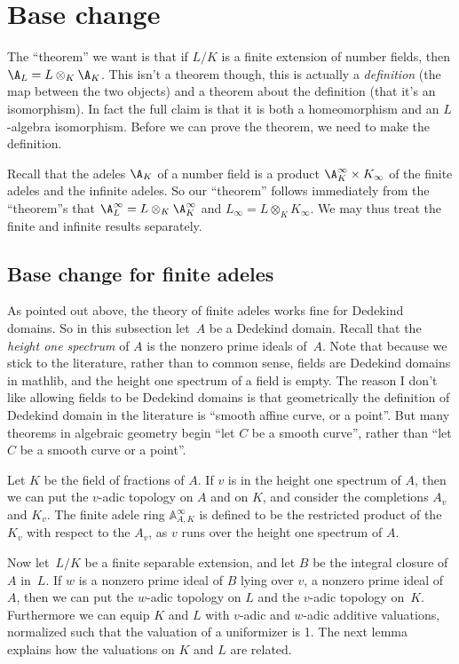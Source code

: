 \section{Base change}

The ``theorem'' we want is that if $L/K$ is a finite extension of number fields,
then $\A_L=L\otimes_K\A_K$. This isn't a theorem though, this is actually a \emph{definition}
(the map between the two objects) and a theorem about
the definition (that it's an isomorphism). In fact the full claim is that it is both a homeomorphism
and an $L$-algebra isomorphism. Before we can prove the theorem, we need to make the
definition.

Recall that the adeles $\A_K$ of a number field is a product $\A_K^\infty\times K_\infty$
of the finite adeles and the infinite adeles. So our ``theorem'' follows immediately from
the ``theorem''s that $\A_L^\infty=L\otimes_K\A_K^\infty$ and $L_\infty=L\otimes_KK_\infty$.
We may thus treat the finite and infinite results separately.

\subsection{Base change for finite adeles}

As pointed out above, the theory of finite adeles works fine for Dedekind domains.
So in this subsection let~$A$ be a Dedekind domain. Recall that the \emph{height one spectrum}
of $A$ is the nonzero prime ideals of~$A$. Note that because we stick to the literature,
rather than to common sense, fields are Dedekind domains in mathlib, and the
height one spectrum of a field is empty. The reason I don't like allowing fields
to be Dedekind domains is that geometrically the definition of Dedekind
domain in the literature is ``smooth affine curve, or a point''. But many theorems in algebraic
geometry begin ``let $C$ be a smooth curve'', rather than ``let $C$ be a smooth curve or a point''.

Let $K$ be the field of fractions of $A$. If $v$ is in the height one spectrum of $A$,
then we can put the $v$-adic topology on $A$ and on $K$, and consider the completions
$A_v$ and $K_v$. The finite adele ring $\mathbb{A}_{A,K}^\infty$ is defined to be
the restricted product of the $K_v$ with respect to the $A_v$, as $v$ runs over
the height one spectrum of $A$.

Now let~$L/K$ be a finite separable extension, and let $B$ be the integral closure of~$A$ in~$L$.
If $w$ is a nonzero prime ideal of $B$ lying over $v$, a nonzero prime ideal of $A$,
then we can put the $w$-adic topology on $L$ and the $v$-adic topology on~$K$. Furthermore
we can equip $K$ and $L$ with $v$-adic and $w$-adic additive valuations, normalized such that the
valuation of a uniformizer is 1. The next lemma explains how the valuations on $K$ and $L$
are related.

